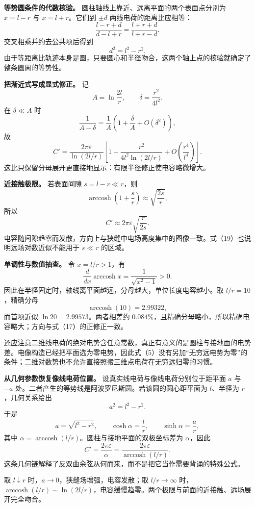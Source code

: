 \documentclass[12pt,a4paper,UTF8]{ctexart}
\begin{document}
\textbf{等势圆条件的代数核验。}
圆柱轴线上靠近、远离平面的两个表面点分别为 \(x=l-r\) 与
\(x=l+r\)。它们到 \(\pm d\) 两线电荷的距离比应相等： \[
\frac{l-r+d}{d-l+r}
=\frac{l+r+d}{l+r-d}. \tag{13}
\] 交叉相乘并约去公共项后得到 \[
d^2=l^2-r^2. \tag{14}
\]
由于等距离比轨迹本身是圆，只要圆心和半径吻合，这两个轴上点的核验就确定了整条圆周的等势性。

\textbf{把渐近式写成显式修正。} 记 \[
A=\ln\frac{2l}{r},
\qquad
\delta=\frac{r^2}{4l^2}. \tag{15}
\] 在 \(\delta\ll A\) 时 \[
\frac1{A-\delta}
=\frac1A\left(1+\frac\delta A+O(\delta^2)\right), \tag{16}
\] 故 \[
C'=\frac{2\pi\varepsilon}{\ln(2l/r)}
\left[
1+\frac{r^2}{4l^2\ln(2l/r)}
+O\!\left(\frac{r^4}{l^4}\right)
\right]. \tag{17}
\] 这比只保留分母展开更直接地显示：有限半径修正使电容略微增大。

\textbf{近接触极限。} 若表面间隙 \(s=l-r\ll r\)，则 \[
\operatorname{arccosh}\left(1+\frac sr\right)
\approx\sqrt{\frac{2s}{r}}, \tag{18}
\] 所以 \[
C'\approx2\pi\varepsilon\sqrt{\frac{r}{2s}}. \tag{19}
\]
电容随间隙趋零而发散，方向上与狭缝中电场高度集中的图像一致。式（19）也说明远场对数近似不能用于
\(s\ll r\) 的区域。

\textbf{单调性与数值抽查。} 令 \(x=l/r>1\)，有 \[
\frac{d}{dx}\operatorname{arccosh}x
=\frac1{\sqrt{x^2-1}}>0. \tag{20}
\] 因此在半径固定时，轴线离平面越远，分母越大，单位长度电容越小。取
\(l/r=10\)，精确分母 \[
\operatorname{arccosh}(10)=2.99322,
\] 而首项近似 \(\ln20=2.99573\)。两者相差约
\(0.084\%\)，且精确分母略小，所以精确电容略大；方向与式（17）的正修正一致。

还应注意二维线电荷的绝对电势含任意常数，真正有意义的是圆柱与接地面的电势差。电像构造已经把平面选为零电势，因此式（5）没有另加``无穷远电势为零''的条件；二维对数势也不允许直接照搬三维点电荷在无穷远归零的习惯。

\textbf{从几何参数恢复像线电荷位置。}
设真实线电荷与像线电荷分别位于距平面 \(a\) 与 \(-a\)
处。二者产生的等势线是阿波罗尼斯圆。若该圆的圆心距平面为 \(l\)、半径为
\(r\)，几何关系给出 \[
a^2=l^2-r^2.
\] 于是 \[
a=\sqrt{l^2-r^2},\qquad
\cosh\alpha=\frac lr,\qquad
\sinh\alpha=\frac ar,
\] 其中
\(\alpha=\operatorname{arccosh}(l/r)\)。圆柱与接地平面的双极坐标差为
\(\alpha\)，因此 \[
C'=\frac{2\pi\varepsilon}{\alpha}
=\frac{2\pi\varepsilon}
{\operatorname{arccosh}(l/r)}.
\]
这条几何链解释了反双曲余弦从何而来，而不是把它当作需要背诵的特殊公式。

取 \(l\downarrow r\) 时，\(a\to0\)，狭缝场增强，电容发散；取
\(l/r\to\infty\)
时，\(\operatorname{arccosh}(l/r)\sim\ln(2l/r)\)，电容缓慢趋零。两个极限与前面的近接触、远场展开完全吻合。
\end{document}
